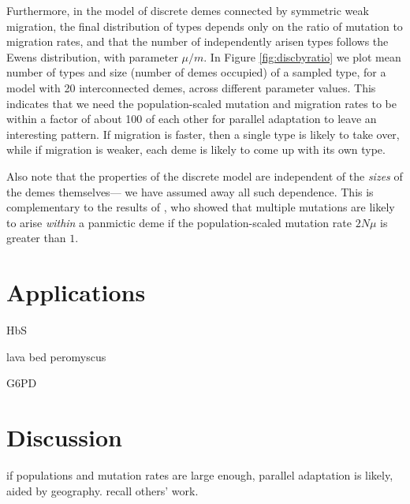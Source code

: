 \documentclass{article}
\begin{document}
{Furthermore, in the model of discrete demes connected by symmetric weak migration, 
the final distribution of types depends only on the ratio of mutation to migration rates,
and that the number of independently arisen types follows the Ewens distribution, with parameter $\mu/m$.
In Figure \ref{fig:discbyratio} we plot mean number of types and size (number of demes occupied) of a sampled type,
for a model with 20 interconnected demes, across different parameter values.  
This indicates that we need the population-scaled mutation and migration rates 
to be within a factor of about 100 of each other for parallel adaptation to leave an interesting pattern.  
If migration is faster, then a single type is likely to take over, while if migration is weaker, each deme is likely to come up with its own type.


Also note that the properties of the discrete model are independent of the {\em sizes} of the demes themselves--- we have assumed away all such dependence.
This is complementary to the results of \cite{softsweepsII}, who showed that multiple mutations are likely to arise {\em within} a panmictic deme
if the population-scaled mutation rate $2 N \mu$ is greater than $1$.

\section{Applications} 

HbS

lava bed peromyscus

G6PD

\section{Discussion} 

if populations and mutation rates are large enough, parallel adaptation is likely, aided by geography. 
recall others' work. 

}
\end{document}
